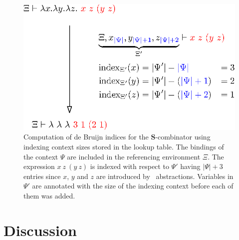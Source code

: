 \begin{figure}[htb]
\centering
\includegraphics{figures/lf-indexing.eps}
\caption[Example of de Bruijn indices computation with respect to a lookup table]{%
Computation of de Bruijn indices for the $\mathbf{S}$-combinator using indexing context sizes stored in the lookup table.
The bindings of the \LF context $\Psi$ are included in the referencing environment $\Xi$.
The expression $x\ z\ (y\ z)$ is indexed with respect to $\Psi'$ having $|\Psi| + 3$ entries since $x$, $y$ and $z$ are introduced by \LF~abstractions.
Variables in $\Psi'$ are annotated with the size of the \LF indexing context before each of them was added.
}
\label{figure:lf-indexing}
\end{figure}

\section{Discussion}

